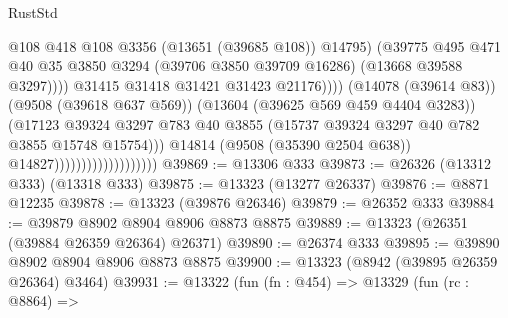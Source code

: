 \begin{lexlean}{RustStd}
\begin{coremodule}
                                                          @108
                                                          @418
                                                          @108
                                                          @3356
                                                          (@13651 (@39685 @108))
                                                          @14795)
                                                        (@39775
                                                          @495
                                                          @471
                                                          @40
                                                          @35
                                                          @3850
                                                          @3294
                                                          (@39706 @3850 @39709 @16286)
                                                          (@13668 @39588 @3297))))
                                                    @31415
                                                    @31418
                                                    @31421
                                                    @31423
                                                    @21176))))
                                            (@14078 (@39614 @83))
                                            (@9508 (@39618 @637 @569))
                                            (@13604 (@39625 @569 @459 @4404 @3283))
                                            (@17123
                                              @39324
                                              @3297
                                              @783
                                              @40
                                              @3855
                                              (@15737 @39324 @3297 @40 @782 @3855 @15748 @15754)))
                                          @14814
                                          (@9508 (@35390 @2504 @638))
                                          @14827)))))))))))))))))))
@39869 := @13306 @333
@39873 := @26326 (@13312 @333) (@13318 @333)
@39875 := @13323 (@13277 @26337)
@39876 := @8871 @12235
@39878 := @13323 (@39876 @26346)
@39879 := @26352 @333
@39884 := @39879 @8902 @8904 @8906 @8873 @8875
@39889 := @13323 (@26351 (@39884 @26359 @26364) @26371)
@39890 := @26374 @333
@39895 := @39890 @8902 @8904 @8906 @8873 @8875
@39900 := @13323 (@8942 (@39895 @26359 @26364) @3464)
@39931 := @13322
    (fun (fn : @454) =>
    @13329
      (fun (rc : @8864) =>

\end{coremodule}
\end{lexlean}
